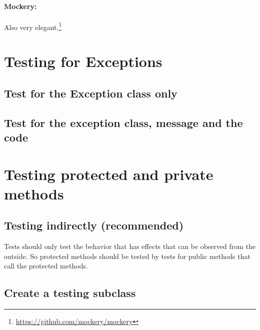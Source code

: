 \documentclass[a4paper,11pt,headsepline]{scrartcl}
\begin{document}
\paragraph{Mockery:} Also very elegant.\footnote{\url{https://github.com/mockery/mockery}}


\pagebreak
\section{Testing for Exceptions}

\subsection{Test for the Exception class only}

\subsection{Test for the exception class, message and the code}


\section{Testing protected and private methods}

\subsection{Testing indirectly (recommended)}

Tests should only test the behavior that has effects that can be observed from the outside. So protected methods should be tested by tests for public methods that call the protected methods.

\subsection{Create a testing subclass}
\end{document}
